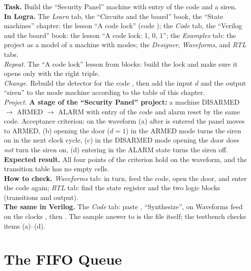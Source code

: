 \begin{diybox}
\textbf{Task.} Build the ``Security Panel'' machine with entry of the code
 and a siren.\\
\textbf{In Logra.} The \emph{Learn} tab, the ``Circuits and the board'' book,
the ``State machines'' chapter: the lesson ``A code lock'' (code
); the \emph{Code} tab, the ``Verilog and the board'' book: the
lesson ``A code lock: 1, 0, 1''; the \emph{Examples} tab: the project
 as a model of a machine with modes; the
\emph{Designer}, \emph{Waveforms}, and \emph{RTL} tabs.\\
 \emph{Repeat.} The ``A code lock'' lesson from blocks: build the
lock and make sure it opens only with the right triple.\\
 \emph{Change.} Rebuild the detector for the code , then
add the input $d$ and the output ``siren'' to the mode machine according to the
table of this chapter.\\
 \emph{Project.} \textbf{A stage of the ``Security Panel'' project:}
a machine DISARMED $\to$ ARMED $\to$ ALARM with entry of the code 
and alarm reset by the same code. Acceptance criterion: on the waveform (a)
after  is entered the panel moves to ARMED, (b) opening the door
($d=1$) in the ARMED mode turns the siren on in the next clock cycle, (c) in
the DISARMED mode opening the door does \emph{not} turn the siren on, (d)
entering  in the ALARM state turns the siren off.\\
\textbf{Expected result.} All four points of the criterion hold on the
waveform, and the transition table has no empty cells.\\
\textbf{How to check.} \emph{Waveforms} tab: in turn, feed the code,
open the door, and enter the code again; \emph{RTL} tab: find the state
register and the two logic blocks (transitions and output).\\
\textbf{The same in Verilog.} The \emph{Code} tab: paste ,
``Synthesize'', on Waveforms feed  on the clocks ,
then . The sample answer to  is the file
 itself; the testbench  checks
items (a)--(d).
\end{diybox}

\section{The FIFO Queue}

